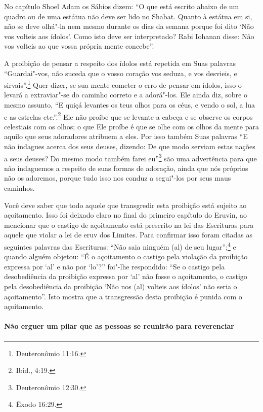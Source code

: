 \begin{multicols}{2}
No capítulo Shoel Adam\starr{} os Sábios dizem: ``O que está escrito abaixo
de um quadro ou de uma estátua não deve ser lido no Shabat. Quanto à
estátua em si, não se deve olhá"-la nem mesmo durante os dias da semana
porque foi dito `Não vos volteis aos ídolos'. Como isto deve ser
interpretado? Rabi Iohanan\starr{} disse: Não vos volteis ao que vossa própria
mente concebe''.

A proibição de pensar a respeito dos ídolos está repetida em Suas
palavras ``Guardai"-vos, não suceda que o vosso coração vos seduza, e vos
desvieis, e sirvais''.\footnote{Deuteronômio 11:16.} Quer dizer, se sua mente
cometer o erro de pensar em ídolos, isso o levará a extraviar"-se do
caminho correto e a adorá"-los. Ele ainda diz, sobre o mesmo assunto, ``E
quiçá levantes os teus olhos para os céus, e vendo o sol, a lua e as
estrelas etc.''.\footnote{Ibid., 4:19.} Ele não proíbe que se levante a cabeça e
se observe os corpos celestiais com os olhos; o que Ele proíbe é que se
olhe com os olhos da mente para aquilo que seus adoradores atribuem a
eles. Por isso também Suas palavras ``E não indagues acerca dos seus
deuses, dizendo: De que modo serviam estas nações a seus deuses? Do
mesmo modo também farei eu''\footnote{Deuteronômio 12:30.} são uma advertência
para que não indaguemos a respeito de suas formas de adoração, ainda que
nós próprios não os adoremos, porque tudo isso nos conduz a segui"-los
por seus maus caminhos.

Você deve saber que todo aquele que transgredir esta proibição está
sujeito ao açoitamento. Isso foi deixado claro no final do primeiro
capítulo do Eruvin\starr{}, ao mencionar que o castigo de açoitamento está
prescrito na lei das Escrituras para aquele que violar a lei de eruv\starr{}
dos Limites. Para confirmar isso foram citadas as seguintes palavras das
Escrituras: ``Não saia ninguém (al) de seu lugar'';\footnote{Êxodo 16:29.} e
quando alguém objetou: ``É o açoitamento o castigo pela violação da
proibição expressa por `al' e não por `lo'?'' foi"-lhe respondido: ``Se o
castigo pela desobediência da proibição expressa por `al' não fosse o
açoitamento, o castigo pela desobediência da proibição `Não nos (al)
volteis aos ídolos' não seria o açoitamento''. Isto mostra que a
transgressão desta proibição é punida com o açoitamento.

\paragraph{Não erguer um pilar que as pessoas se reunirão para reverenciar}


\end{multicols}
